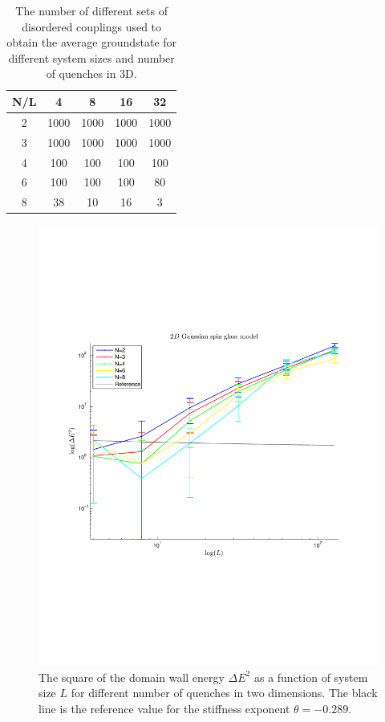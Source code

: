 \documentclass[paper=a4, fontsize=11pt]{scrartcl} %
\numberwithin{equation}{section} %
\numberwithin{figure}{section} %
\numberwithin{table}{section} %
\begin{document}
\begin{table}[h]
\label{tab:couplings_3D}
\centering
  \begin{tabular}{| c | c | c | c | c |}
    \hline
    N/L & 4 & 8 & 16 & 32 \\ \hline
	2 & 1000 & 1000 & 1000 & 1000 \\ \hline
	3 & 1000 & 1000 & 1000 & 1000 \\ \hline
	4 & 100 & 100 & 100 & 100 \\ \hline
	6 & 100 & 100 & 100 & 80 \\ \hline
	8 & 38 & 10 & 16 & 3 \\ \hline
  \end{tabular}
  \caption{The number of different sets of disordered couplings used to obtain the average groundstate for different system sizes and number of quenches in 3D.}
\end{table}

\begin{figure}
\centering
\includegraphics[width=\textwidth]{images/spinglass2D_large.pdf}
\caption{The square of the domain wall energy $\Delta E ^ 2$ as a function of system size $L$ for different number of quenches in two dimensions. The black line is the reference value for the stiffness exponent $\theta=-0.289$.}
\label{fig:E_2D_large}
\end{figure}
\end{document}
